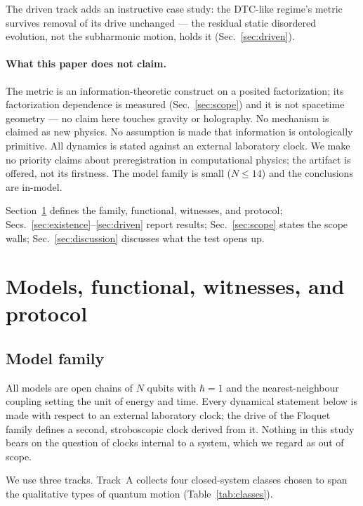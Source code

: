 \documentclass[a4paper,11pt,noarxiv]{quantumarticle}
\begin{document}
The driven track adds an instructive case study: the DTC-like regime's
metric survives removal of its drive unchanged --- the residual static
disordered evolution, not the subharmonic motion, holds it
(Sec.~\ref{sec:driven}).

\paragraph{What this paper does not claim.} The metric is an
information-theoretic construct on a posited factorization; its
factorization dependence is measured (Sec.~\ref{sec:scope}) and it is
not spacetime geometry --- no claim here touches gravity or holography.
No mechanism is claimed as new physics. No assumption is made that
information is ontologically primitive. All dynamics is stated against
an external laboratory clock. We make no priority claims about
preregistration in computational physics; the artifact is offered, not
its firstness. The model family is small ($N \leq 14$) and the
conclusions are in-model.

Section~\ref{sec:setup} defines the family, functional, witnesses, and
protocol; Secs.~\ref{sec:existence}--\ref{sec:driven} report results;
Sec.~\ref{sec:scope} states the scope walls; Sec.~\ref{sec:discussion}
discusses what the test opens up.

\section{Models, functional, witnesses, and protocol}\label{sec:setup}

\subsection{Model family}\label{sec:family}

All models are open chains of $N$ qubits with $\hbar = 1$ and the
nearest-neighbour coupling setting the unit of energy and time. Every
dynamical statement below is made with respect to an external
laboratory clock; the drive of the Floquet family defines a second,
stroboscopic clock derived from it. Nothing in this study bears on the
question of clocks internal to a system, which we regard as out of
scope.

We use three tracks. Track~A collects four closed-system classes chosen
to span the qualitative types of quantum motion
(Table~\ref{tab:classes}).
\end{document}
